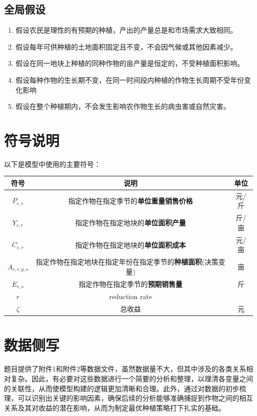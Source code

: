 \documentclass{cumcmthesis}
\begin{document}
\subsection{全局假设}
\begin{enumerate}
    \item 假设农民是理性的有预期的种植，产出的产量总是和市场需求大致相同。
    \item 假设每年可供种植的土地面积固定且不变，不会因气候或其他因素减少。
    \item 假设在同一地块上种植的同种作物的亩产量是恒定的，不受种植面积影响。
    \item 假设每种作物的生长期不变，在同一时间段内种植的作物生长周期不受年份变化影响
    \item 假设在整个种植期内，不会发生影响农作物生长的病虫害或自然灾害。
\end{enumerate}


\section{符号说明}
以下是模型中使用的主要符号：
\begin{table}[!htbp]
    \begin{tabular}{ccc}
        \toprule[1.5pt]
        符号 & 说明 & 单位\\
        \midrule[1pt]
        $P_{c,s}$ & 指定作物在指定季节的\textbf{单位重量销售价格} & 元/斤 \\
        $Y_{c,r}$ & 指定作物在指定地块的\textbf{单位面积产量} & 斤/亩\\
        $C_{c,r}$ & 指定作物在指定地块的\textbf{单位面积成本} & 元/亩\\
        $A_{c,r,y,s}$ & 指定作物在指定地块在指定年份在指定季节的\textbf{种植面积}(决策变量) & 亩\\
        $E_{c,s}$ & 指定作物在指定季节的\textbf{预期销售量} & 斤\\
        $r$ & reduction rate & \\
        
        $\zeta$ & 总收益 & 元\\
        \bottomrule[1.5pt]
    \end{tabular}
\end{table}

\section{数据侧写}
题目提供了附件1和附件2等数据文件，虽然数据量不大，但其中涉及的各类关系相对复杂。因此，有必要对这些数据进行一个简要的分析和整理，以理清各变量之间的关联性，从而使模型构建的逻辑更加清晰和合理。此外，通过对数据的初步梳理，可以识别出关键的影响因素，确保后续的分析能够准确捕捉到作物之间的相互关系及其对收益的潜在影响，从而为制定最优种植策略打下扎实的基础。
\end{document}
